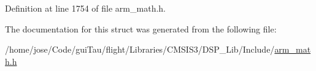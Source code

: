 Definition at line 1754 of file arm\-\_\-math.\-h.



The documentation for this struct was generated from the following file\-:\begin{DoxyCompactItemize}
\item 
/home/jose/\-Code/gui\-Tau/flight/\-Libraries/\-C\-M\-S\-I\-S3/\-D\-S\-P\-\_\-\-Lib/\-Include/\hyperlink{arm__math_8h}{arm\-\_\-math.\-h}\end{DoxyCompactItemize}
